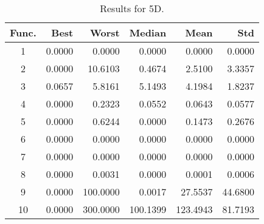 \begin{table}[ht]
\centering
\caption{ Results for 5D. }
\label{tab:5D}
\begin{tabular}{crrrrr}
\hline
{Func.} & Best & Worst & Median & Mean & Std \\
\hline
1 & 0.0000 & 0.0000 & 0.0000 & 0.0000 & 0.0000 \\
2 & 0.0000 & 10.6103 & 0.4674 & 2.5100 & 3.3357 \\
3 & 0.0657 & 5.8161 & 5.1493 & 4.1984 & 1.8237 \\
4 & 0.0000 & 0.2323 & 0.0552 & 0.0643 & 0.0577 \\
5 & 0.0000 & 0.6244 & 0.0000 & 0.1473 & 0.2676 \\
6 & 0.0000 & 0.0000 & 0.0000 & 0.0000 & 0.0000 \\
7 & 0.0000 & 0.0000 & 0.0000 & 0.0000 & 0.0000 \\
8 & 0.0000 & 0.0031 & 0.0000 & 0.0001 & 0.0006 \\
9 & 0.0000 & 100.0000 & 0.0017 & 27.5537 & 44.6800 \\
10 & 0.0000 & 300.0000 & 100.1399 & 123.4943 & 81.7193 \\
\hline
\end{tabular}
\end{table}
